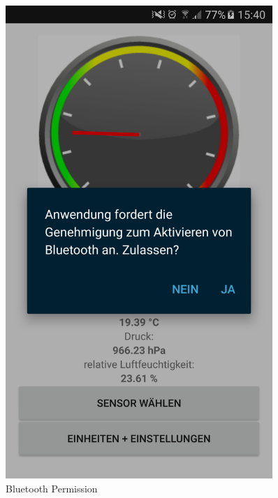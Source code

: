 \begin{figure}[ht]
 \begin{minipage}[t]{0.5\textwidth}
    \includegraphics[width=0.9\textwidth]{4Resultate/imag/BLEBluetoothPermission.png} 
    \caption{Bluetooth Permission}
    \label{permission}
 \end{minipage}
 \begin{minipage}[t]{0.5\textwidth}

\end{minipage}
\end{figure}

